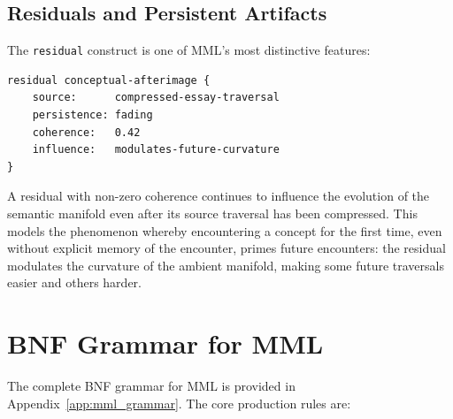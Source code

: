 \documentclass[12pt,oneside]{book}
\theoremstyle{plain}
\theoremstyle{definition}
\theoremstyle{plain}
\begin{document}
\subsection{Residuals and Persistent Artifacts}

The \texttt{residual} construct is one of MML's most distinctive features:

\begin{lstlisting}
residual conceptual-afterimage {
    source:      compressed-essay-traversal
    persistence: fading
    coherence:   0.42
    influence:   modulates-future-curvature
}
\end{lstlisting}

A residual with non-zero coherence continues to influence the evolution of the semantic manifold even after its source traversal has been compressed. This models the phenomenon whereby encountering a concept for the first time, even without explicit memory of the encounter, primes future encounters: the residual modulates the curvature of the ambient manifold, making some future traversals easier and others harder.

\section{BNF Grammar for MML}
\label{sec:mml_bnf}

The complete BNF grammar for MML is provided in Appendix~\ref{app:mml_grammar}. The core production rules are:
\end{document}
